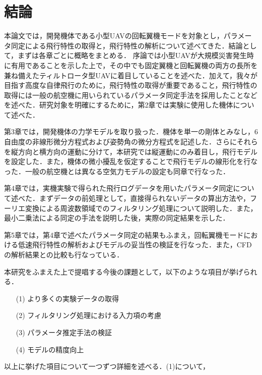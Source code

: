 
\chapter{結論}
\label{conclusion}

本論文では，開発機体である小型UAVの回転翼機モードを対象とし，パラメータ同定による飛行特性の取得と，飛行特性の解析について述べてきた．結論として，まずは各章ごとに概略をまとめる．
序論では小型UAVが大規模災害発生時に有用であることを示した上で，その中でも固定翼機と回転翼機の両方の長所を兼ね備えたティルトロータ型UAVに着目していることを述べた．加えて，我々が目指す高度な自律飛行のために，飛行特性の取得が重要であること，飛行特性の取得には一般の航空機に用いられているパラメータ同定手法を採用したことなどを述べた．研究対象を明確にするために，第2章では実験に使用した機体について述べた．

第3章では，開発機体の力学モデルを取り扱った．機体を単一の剛体とみなし，6自由度の非線形微分方程式および姿勢角の微分方程式を記述した．さらにそれらを縦方向と横方向の運動に分けて，本研究では縦運動にのみ着目し，飛行モデルを設定した．また，機体の微小擾乱を仮定することで飛行モデルの線形化を行なった．一般の航空機とは異なる空気力モデルの設定も同章で行なった．

第4章では，実機実験で得られた飛行ログデータを用いたパラメータ同定について述べた．まずデータの前処理として，直接得られないデータの算出方法や，フーリエ変換による周波数領域でのフィルタリング処理について説明した．また，最小二乗法による同定の手法を説明した後，実際の同定結果を示した．

第5章では，第4章で述べたパラメータ同定の結果もふまえ，回転翼機モードにおける低速飛行特性の解析およびモデルの妥当性の検証を行なった．また，CFDの解析結果との比較も行なっている．

\vspace{5pt}

本研究をふまえた上で提唱する今後の課題として，以下のような項目が挙げられる．
\begin{itemize}
  \item[(1)] より多くの実験データの取得
  \item[(2)] フィルタリング処理における入力項の考慮
  \item[(3)] パラメータ推定手法の検証
  \item[(4)] モデルの精度向上
\end{itemize}

以上に挙げた項目について一つずつ詳細を述べる．(1)について，

